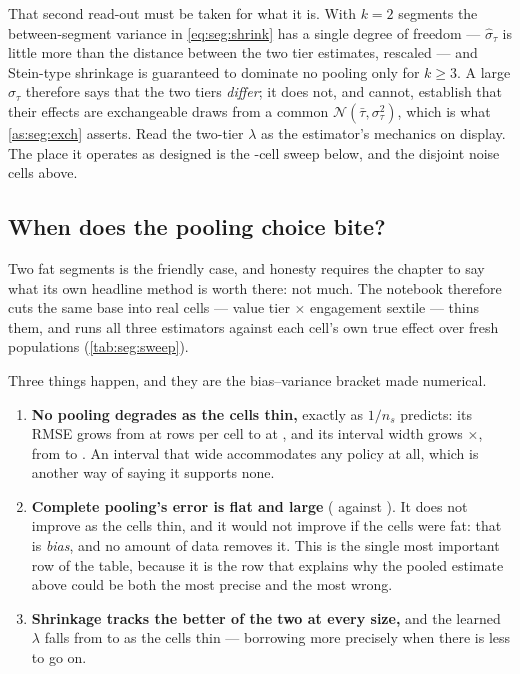That second read-out must be taken for what it is. With $k = 2$ segments the between-segment
variance in \cref{eq:seg:shrink} has a single degree of freedom --- $\hat\sigma_\tau$ is little more
than the distance between the two tier estimates, rescaled --- and Stein-type shrinkage is
guaranteed to dominate no pooling only for $k \ge 3$. A large $\hat\sigma_\tau$ therefore says that
the two tiers \emph{differ}; it does not, and cannot, establish that their effects are exchangeable
draws from a common $\mathcal N(\bar\tau, \sigma_\tau^2)$, which is what \cref{as:seg:exch} asserts.
Read the two-tier $\lambda$ as the estimator's mechanics on display. The place it operates as
designed is the \nbTwoSweepCells-cell sweep below, and the \nbTwoNNoise{} disjoint noise cells above.



\subsection*{When does the pooling choice bite?}

Two fat segments is the friendly case, and honesty requires the chapter to say what its own headline
method is worth there: not much. The notebook therefore cuts the same base into \nbTwoSweepCells{}
real cells --- value tier $\times$ engagement sextile --- thins them, and runs all three estimators
against each cell's own true effect over \nbTwoSweepReps{} fresh populations
(\cref{tab:seg:sweep}).

Three things happen, and they are the bias--variance bracket made numerical.

\begin{enumerate}[leftmargin=*]
  \item \textbf{No pooling degrades as the cells thin,} exactly as $1/n_s$ predicts: its RMSE grows
        from \eur{\nbTwoSweepFatNp} at \nbTwoSweepFatRows{} rows per cell to \eur{\nbTwoSweepThinNp}
        at \nbTwoSweepThinRows, and its interval width grows
        \nbTwoSweepWidthGrowth$\times$, from \eur{\nbTwoSweepFatWidth} to
        \eur{\nbTwoSweepThinWidth}. An interval that wide accommodates any policy at all, which is
        another way of saying it supports none.
  \item \textbf{Complete pooling's error is flat and large}
        (\eur{\nbTwoSweepFatCp} against \eur{\nbTwoSweepThinCp}). It does not improve as the cells
        thin, and it would not improve if the cells were fat: that is \emph{bias}, and no amount of
        data removes it. This is the single most important row of the table, because it is the row
        that explains why the pooled estimate above could be both the most precise and the most
        wrong.
  \item \textbf{Shrinkage tracks the better of the two at every size,} and the learned $\lambda$
        falls from \nbTwoSweepFatLam{} to \nbTwoSweepThinLam{} as the cells thin --- borrowing more
        precisely when there is less to go on.
\end{enumerate}

